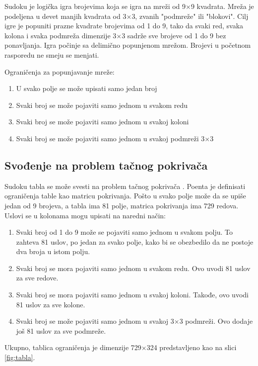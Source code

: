 \documentclass[a4paper]{article}
\begin{document}
{Sudoku je logička igra brojevima koja se igra na mreži od 9$\times$9 kvadrata. Mreža je podeljena u devet manjih kvadrata od 3$\times$3,
zvanih "podmreže" ili "blokovi". Cilj igre je popuniti prazne kvadrate brojevima od 1 do 9, tako da svaki red, svaka kolona i
svaka podmreža dimenzije 3$\times$3 sadrže sve brojeve od 1 do 9 bez ponavljanja. Igra počinje sa delimično popunjenom mrežom. Brojevi u početnom
rasporedu ne smeju se menjati.

Ograničenja za popunjavanje mreže:
\begin{enumerate}
  \item U svako polje se može upisati samo jedan broj
  \item Svaki broj se može pojaviti samo jednom u svakom redu
  \item Svaki broj se može pojaviti samo jednom u svakoj koloni
  \item Svaki broj se može pojaviti samo jednom u svakoj podmreži 3$\times$3
\end{enumerate}

\subsection{Svođenje na problem tačnog pokrivača}

Sudoku tabla se može svesti na problem tačnog pokrivača \cite{sudoku}. Poenta je definisati ograničenja table kao
matricu pokrivanja. Pošto u svako polje može da se upiše jedan od 9 brojeva, a tabla ima 81 polje, matrica pokrivanja
ima 729 redova. Uslovi se u kolonama mogu upisati na naredni način:
\begin{enumerate}
  \item Svaki broj od 1 do 9 može se pojaviti samo jednom u svakom polju. To zahteva 81 uslov, po jedan za svako polje, kako bi se obezbedilo da ne postoje dva broja u istom polju.
  \item Svaki broj se mora pojaviti samo jednom u svakom redu. Ovo uvodi 81 uslov za sve redove.
  \item Svaki broj se mora pojaviti samo jednom u svakoj koloni. Takođe, ovo uvodi 81 uslov za sve kolone.
  \item Svaki broj se može pojaviti samo jednom u svakoj 3$\times$3 podmreži. Ovo dodaje još 81 uslov za sve podmreže.
\end{enumerate}

Ukupno, tablica ograničenja je dimenzije 729$\times$324 predstavljeno kao na slici \ref{fig:tabla}. 

}
\end{document}
